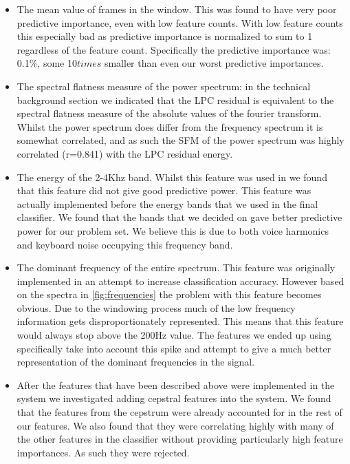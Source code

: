 \documentclass[ %
                    author={Sam Phippen},
                supervisor={Dr. Rafal Bogacz},
                     title={Real time voice activity detectors in noisy personal computing environments},
                  subtitle={},
                    degree={MEng},
                      year={2012} ]{thesis}
\begin{document}
\begin{itemize}

    \item The mean value of frames in the window. This was found to have very
        poor predictive importance, even with low feature counts. With low
        feature counts this especially bad as predictive importance is
        normalized to sum to 1 regardless of the feature count. Specifically
        the predictive importance was: 0.1\%, some 10$times$ smaller than even
        our worst predictive importances.

    \item The spectral flatness measure of the power spectrum: in the technical
        background section we indicated that the LPC residual is equivalent to
        the spectral flatness measure of the absolute values of the fourier
        transform. Whilst the power spectrum does differ from the frequency
        spectrum it is somewhat correlated, and as such the SFM of the power
        spectrum was highly correlated (r=0.841) with the LPC residual energy.

    \item The energy of the 2-4Khz band. Whilst this feature was used in
        \cite{shin} we found that this feature did not give good predictive
        power. This feature was actually implemented before the energy bands
        that we used in the final classifier. We found that the bands that we
        decided on gave better predictive power for our problem set. We believe
        this is due to both voice harmonics and keyboard noise occupying this
        frequency band.

    \item The dominant frequency of the entire spectrum. This feature was
        originally implemented in an attempt to increase classification
        accuracy. However based on the spectra in \ref{fig:frequencies} the
        problem with this feature becomes obvious. Due to the windowing process
        much of the low frequency information gets disproportionately
        represented. This means that this feature would always stop above the
        200Hz value. The features we ended up using specifically take into
        account this spike and attempt to give a much better representation of
        the dominant frequencies in the signal.

    \item After the features that have been described above were implemented in
        the system we investigated adding cepstral features into the system. We
        found that the features from the cepstrum were already accounted for in
        the rest of our features. We also found that they were correlating
        highly with many of the other features in the classifier without
        providing particularly high feature importances. As such they were
        rejected.

    \end{itemize}
\end{document}
